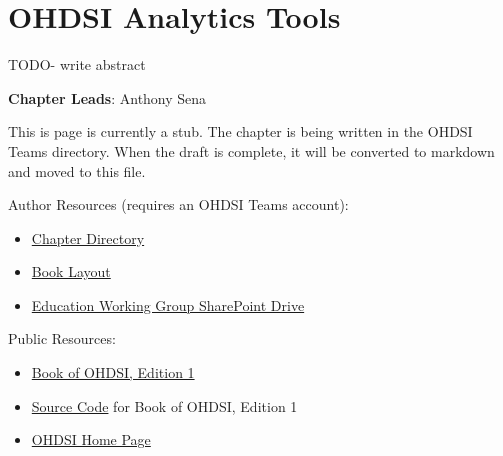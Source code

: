 \documentclass[
  letterpaper,
  paper=7in:10in,
  pagesize=pdftex,
  headinclude=on,
  footinclude=on,
  12pt]{scrbook}
\providecommand{\tightlist}{%
  \setlength{\itemsep}{0pt}\setlength{\parskip}{0pt}}\usepackage{longtable,booktabs,array}
\begin{document}
\chapter{OHDSI Analytics Tools}\label{sec-analytics-tools}

TODO- write abstract

\hfill\break

\textbf{Chapter Leads}: Anthony Sena

\begin{tcolorbox}[enhanced jigsaw, opacitybacktitle=0.6, coltitle=black, colback=white, bottomrule=.15mm, bottomtitle=1mm, title=\textcolor{quarto-callout-note-color}{\faInfo}\hspace{0.5em}{Note}, titlerule=0mm, rightrule=.15mm, colbacktitle=quarto-callout-note-color!10!white, colframe=quarto-callout-note-color-frame, toptitle=1mm, arc=.35mm, left=2mm, breakable, opacityback=0, leftrule=.75mm, toprule=.15mm]

This is page is currently a stub. The chapter is being written in the
OHDSI Teams directory. When the draft is complete, it will be converted
to markdown and moved to this file.

Author Resources (requires an OHDSI Teams account):

\begin{itemize}
\tightlist
\item
  \href{https://ohdsiorg.sharepoint.com/sites/Workgroup-EducationWorkingGroup/Shared\%20Documents/Forms/AllItems.aspx?id=\%2Fsites\%2FWorkgroup\%2DEducationWorkingGroup\%2FShared\%20Documents\%2FSection\%20III\%20\%2D\%20Analytics\%2FChapter\%209\%20OHDSI\%20Analytical\%20Tools&viewid=05fec2cc\%2Dec8a\%2D4d04\%2Db565\%2Dcf1289b96f67}{Chapter
  Directory}
\item
  \href{https://ohdsiorg.sharepoint.com/:x:/r/sites/Workgroup-EducationWorkingGroup/_layouts/15/Doc2.aspx?action=edit&sourcedoc=\%7B1fa31e39-1c5f-4918-b878-609ebd9810b3\%7D&wdOrigin=TEAMS-WEB.teamsSdk_ns.rwc&wdExp=TEAMS-TREATMENT&wdhostclicktime=1748104477731&web=1}{Book
  Layout}
\item
  \href{https://ohdsiorg.sharepoint.com/sites/Workgroup-EducationWorkingGroup/Shared\%20Documents/Forms/AllItems.aspx?viewid=05fec2cc\%2Dec8a\%2D4d04\%2Db565\%2Dcf1289b96f67}{Education
  Working Group SharePoint Drive}
\end{itemize}

Public Resources:

\begin{itemize}
\tightlist
\item
  \href{https://ohdsi.github.io/TheBookOfOhdsi/}{Book of OHDSI, Edition
  1}
\item
  \href{https://github.com/OHDSI/TheBookOfOhdsi}{Source Code} for Book
  of OHDSI, Edition 1
\item
  \href{https://ohdsi.org/}{OHDSI Home Page}
\end{itemize}

\end{tcolorbox}
\end{document}
